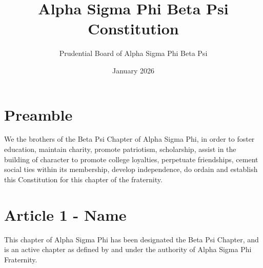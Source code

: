 \documentclass{article}
\title{Alpha Sigma Phi Beta Psi Constitution}
\author{Prudential Board of Alpha Sigma Phi Beta Psi}
\date{January 2026}
\begin{document}
\maketitle

\section*{Preamble}
\hspace*{1cm}We the brothers of the Beta Psi Chapter of Alpha Sigma Phi, in order to foster education, maintain charity, promote patriotism,  scholarship, assist in the building of character to promote college loyalties, perpetuate friendships, cement social ties within its membership, develop independence, do ordain and establish this Constitution for this chapter of the fraternity.

\section*{Article 1 - Name}
\hspace*{1cm}This chapter of Alpha Sigma Phi has been designated the Beta Psi Chapter, and is an active chapter as defined by and under the authority of Alpha Sigma Phi Fraternity.
\end{document}
